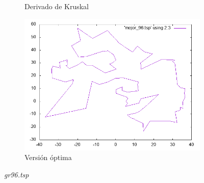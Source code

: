 \documentclass[12pt,spanish]{article}
\begin{document}
\begin{figure}[H]
\begin{subfigure}[b]{0.36\textwidth}
\caption{Derivado de Kruskal}
\end{subfigure}
\quad
\begin{subfigure}[b]{0.36\textwidth}
\includegraphics[width=\textwidth]{gr96_mejor.png}
\caption{Versión óptima}
\end{subfigure}
\caption{\textit{gr96.tsp}}
\end{figure}
\end{document}
